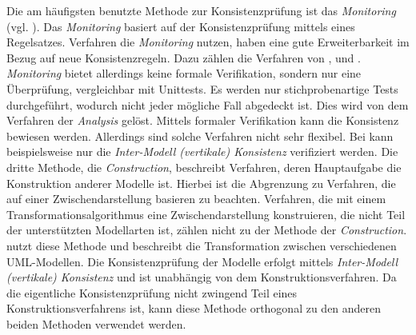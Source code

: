 Die am häufigsten benutzte Methode zur Konsistenzprüfung ist das \emph{Monitoring} (vgl. \cite{Usman2008}).
Das \emph{Monitoring} basiert auf der Konsistenzprüfung mittels eines Regelsatzes. 
Verfahren die \emph{Monitoring} nutzen, haben eine gute Erweiterbarkeit im Bezug auf neue Konsistenzregeln.
Dazu zählen die Verfahren von \cite{Rasch2003}, \cite{Mens2005} und \cite{Egyed2006}.
\emph{Monitoring} bietet allerdings keine formale Verifikation, sondern nur eine Überprüfung, vergleichbar mit Unittests.
Es werden nur stichprobenartige Tests durchgeführt, wodurch nicht jeder mögliche Fall abgedeckt ist.
Dies wird von dem Verfahren der \emph{Analysis} gelöst.
Mittels formaler Verifikation kann die Konsistenz bewiesen werden.
Allerdings sind solche Verfahren nicht sehr flexibel.
Bei \cite{Shinkawa2006} kann beispielsweise nur die \emph{Inter-Modell (vertikale) Konsistenz} verifiziert werden.
Die dritte Methode, die \emph{Construction}, beschreibt Verfahren, deren Hauptaufgabe die Konstruktion anderer Modelle ist.
Hierbei ist die Abgrenzung zu Verfahren, die auf einer Zwischendarstellung basieren zu beachten.
Verfahren, die mit einem Transformationsalgorithmus eine Zwischendarstellung konstruieren, die nicht Teil der unterstützten Modellarten ist, zählen nicht zu der Methode der \emph{Construction}.
\cite{Egyed2001} nutzt diese Methode und beschreibt die Transformation zwischen verschiedenen UML-Modellen.
Die Konsistenzprüfung der Modelle erfolgt mittels \emph{Inter-Modell (vertikale) Konsistenz} und ist unabhängig von dem Konstruktionsverfahren.
Da die eigentliche Konsistenzprüfung nicht zwingend Teil eines Konstruktionsverfahrens ist, kann diese Methode orthogonal zu den anderen beiden Methoden verwendet werden.
